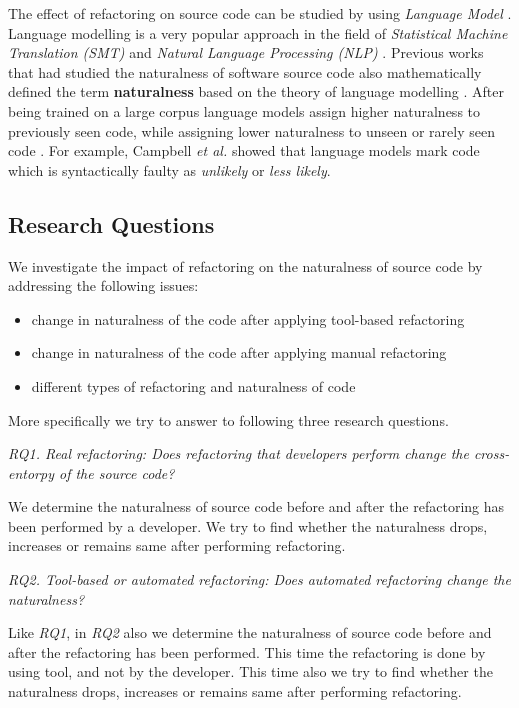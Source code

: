 \documentclass[conference]{IEEEtran}
\begin{document}
The effect of refactoring on source code can be studied by using \textit{Language Model} \cite{Brown}. Language modelling is a very popular approach in the field of \textit{Statistical Machine Translation (SMT)} \cite{Koehn} and \textit{Natural Language Processing (NLP)} \cite{Jones}. Previous works that had studied the naturalness of software source code also mathematically defined the term \textbf{naturalness} based on the theory of language modelling \cite{Ray}\cite{Hindle}\cite{Tu}. After being trained on a large corpus language models assign higher naturalness to previously seen code, while assigning lower naturalness to unseen or rarely seen code \cite{Tu}. For example, Campbell \textit{et al.} \cite{Campbell} showed that language models mark code which is syntactically faulty as \textit{unlikely} or \textit{less likely}.

\subsection{Research Questions}
We investigate the impact of refactoring on the naturalness of source code by addressing the following issues:
\begin{itemize}
\item change in naturalness of the code after applying tool-based refactoring
\item change in naturalness of the code after applying manual refactoring
\item different types of refactoring and naturalness of code
\end{itemize}
More specifically we try to answer to following three research questions.

\textit{RQ1. Real refactoring: Does refactoring that developers perform change the cross-entorpy of the source code?}

We determine the naturalness of source code before and after the refactoring has been performed by a developer. We try to find whether the naturalness drops, increases or remains same after performing refactoring.

\textit{RQ2. Tool-based or automated refactoring: Does automated refactoring change the naturalness?}

Like \textit{RQ1}, in \textit{RQ2} also we determine the naturalness of source code before and after the refactoring has been performed. This time the refactoring is done by using tool, and not by the developer. This time also we try to find whether the naturalness drops, increases or remains same after performing refactoring.
\end{document}
